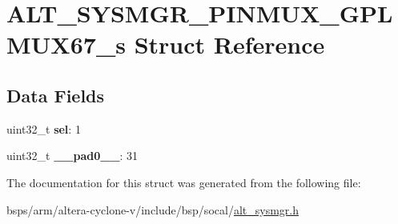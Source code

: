 \hypertarget{structALT__SYSMGR__PINMUX__GPLMUX67__s}{}\section{A\+L\+T\+\_\+\+S\+Y\+S\+M\+G\+R\+\_\+\+P\+I\+N\+M\+U\+X\+\_\+\+G\+P\+L\+M\+U\+X67\+\_\+s Struct Reference}
\label{structALT__SYSMGR__PINMUX__GPLMUX67__s}
\subsection*{Data Fields}
\begin{DoxyCompactItemize}
\item 
\mbox{\label{structALT__SYSMGR__PINMUX__GPLMUX67__s_a248654911d6e551bc23775274bf109e1}} 
uint32\+\_\+t {\bfseries sel}\+: 1
\item 
\mbox{\label{structALT__SYSMGR__PINMUX__GPLMUX67__s_acdaea3ac159592f5a42d10c8ef635a1d}} 
uint32\+\_\+t {\bfseries \+\_\+\+\_\+pad0\+\_\+\+\_\+}\+: 31
\end{DoxyCompactItemize}


The documentation for this struct was generated from the following file\+:\begin{DoxyCompactItemize}
\item 
bsps/arm/altera-\/cyclone-\/v/include/bsp/socal/\mbox{\hyperlink{alt__sysmgr_8h}{alt\+\_\+sysmgr.\+h}}\end{DoxyCompactItemize}
